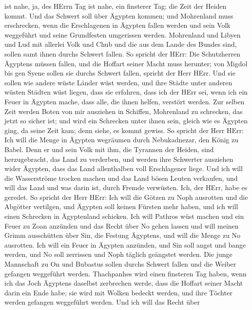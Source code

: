 ist nahe, ja, des HErrn Tag ist nahe, ein finsterer Tag; die Zeit der
Heiden kommt.  Und das Schwert soll über Ägypten kommen; und
Mohrenland muss erschrecken, wenn die Erschlagenen in Ägypten fallen
werden und sein Volk weggeführt und seine Grundfesten umgerissen werden.
 Mohrenland und Libyen und Lud mit allerlei Volk und Chub
und die aus dem Lande des Bundes sind, sollen samt ihnen durchs Schwert
fallen.  So spricht der HErr: Die Schutzherren Ägyptens
müssen fallen, und die Hoffart seiner Macht muss herunter; von Migdol
bis gen Syene sollen sie durchs Schwert fallen, spricht der Herr HErr.
 Und sie sollen wie andere wüste Länder wüst werden, und
ihre Städte unter anderen wüsten Städten wüst liegen,  dass
sie erfahren, dass ich der HErr sei, wenn ich ein Feuer in Ägypten
mache, dass alle, die ihnen helfen, verstört werden.  Zur
selben Zeit werden Boten von mir ausziehen in Schiffen, Mohrenland zu
schrecken, das jetzt so sicher ist; und wird ein Schrecken unter ihnen
sein, gleich wie es Ägypten ging, da seine Zeit kam; denn siehe, es
kommt gewiss.  So spricht der Herr HErr: Ich will die Menge
in Ägypten wegräumen durch Nebukadnezar, den König zu Babel.
 Denn er und sein Volk mit ihm, die Tyrannen der Heiden,
sind herzugebracht, das Land zu verderben, und werden ihre Schwerter
ausziehen wider Ägypten, dass das Land allenthalben voll Erschlagener
liege.  Und ich will die Wasserströme trocken machen und
das Land bösen Leuten verkaufen, und will das Land und was darin ist,
durch Fremde verwüsten. Ich, der HErr, habe es geredet.  So
spricht der Herr HErr: Ich will die Götzen zu Noph ausrotten und die
Abgötter vertilgen, und Ägypten soll keinen Fürsten mehr haben, und ich
will einen Schrecken in Ägyptenland schicken.  Ich will
Pathros wüst machen und ein Feuer zu Zoan anzünden und das Recht über No
gehen lassen  und will meinen Grimm ausschütten über Sin,
die Festung Ägyptens, und will die Menge zu No ausrotten. 
Ich will ein Feuer in Ägypten anzünden, und Sin soll angst und bange
werden, und No soll zerrissen und Noph täglich geängstet werden.
 Die junge Mannschaft zu On und Bubastus sollen durchs
Schwert fallen und die Weiber gefangen weggeführt werden. 
Thachpanhes wird einen finsteren Tag haben, wenn ich das Joch Ägyptens
daselbst zerbrechen werde, dass die Hoffart seiner Macht darin ein Ende
habe; sie wird mit Wolken bedeckt werden, und ihre Töchter werden
gefangen weggeführt werden.  Und ich will das Recht über
